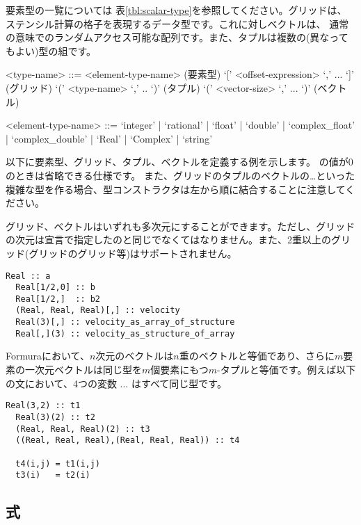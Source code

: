 \documentclass{jsarticle}
\def\<#1>{\synt{#1}}
\begin{document}
要素型の一覧については
表\ref{tbl:scalar-type}を参照してください。グリッドは、ステンシル計算の格子を表現するデータ型です。これに対しベクトルは、
通常の意味でのランダムアクセス可能な配列です。また、タプルは複数の(異なってもよい)型の組です。

\begin{grammar}
<type-name> ::= <element-type-name>                  \hfill {(要素型)}
 `[' <offset-expression> `,' ... `]' \hfill {(グリッド)}
\alt `(' <type-name> `,' .. `)'                      \hfill {(タプル)}
 `(' <vector-size> `,' ... `)'                   \hfill {(ベクトル)}

<element-type-name> ::= `integer' | `rational' | `float' | `double'
| `complex_float' | `complex_double'
| `Real' | `Complex' | `string'
\end{grammar}

以下に要素型、グリッド、タプル、ベクトルを定義する例を示します。
\<offset-expression> の値が0のときは省略できる仕様です。
また、グリッドのタプルのベクトルの…といった複雑な型を作る場合、型コンストラクタは左から順に結合することに注意してください。

グリッド、ベクトルはいずれも多次元にすることができます。ただし、グリッドの次元は宣言で指定したのと同じでなくてはなりません。また、2重以上のグリッド(グリッドのグリッド等)はサポートされません。

\begin{lstlisting}[mathescape]
  Real :: a
  Real[1/2,0] :: b
  Real[1/2,]  :: b2
  (Real, Real, Real)[,] :: velocity
  Real(3)[,] :: velocity_as_array_of_structure
  Real[,](3) :: velocity_as_structure_of_array
\end{lstlisting}

Formuraにおいて、$n$次元のベクトルは$n$重のベクトルと等価であり、さらに$m$要素の一次元ベクトルは同じ型を$m$個要素にもつ$m$-タプルと等価です。例えば以下の文において、4つの変数 ... はすべて同じ型です。

\begin{lstlisting}[mathescape]
  Real(3,2) :: t1
  Real(3)(2) :: t2
  (Real, Real, Real)(2) :: t3
  ((Real, Real, Real),(Real, Real, Real)) :: t4

  t4(i,j) = t1(i,j)
  t3(i)   = t2(i)
\end{lstlisting}



\subsection{式}
\end{document}
